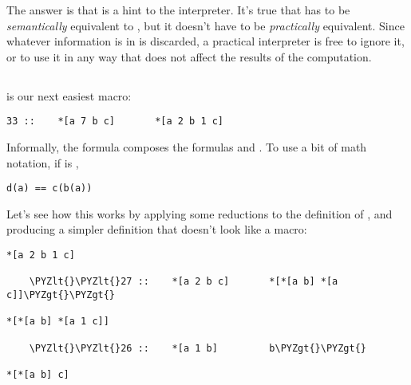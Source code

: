 The answer is that  is a hint to the interpreter.  It's true
that \kode{[10 b c]} has to be \emph{semantically} equivalent to , but
it doesn't have to be \emph{practically} equivalent.  Since whatever
information is in  is discarded, a practical interpreter is
free to ignore it, or to use it in any way that does not affect
the results of the computation.

\subsection{}

 is our next easiest macro:

\begin{framed_shaded}
\begin{Verbatim}[fontsize=\relsize{-2.5},fontseries=b,commandchars=\\\{\}]
33 ::    *[a 7 b c]       *[a 2 b 1 c]
\end{Verbatim}
\end{framed_shaded}

Informally, the formula \kode{[7 b c]} composes the formulas  and
.  To use a bit of math notation, if  is \kode{[7 b c]},

\begin{framed_shaded}
\begin{Verbatim}[fontsize=\relsize{-2.5},fontseries=b,commandchars=\\\{\}]
d(a) == c(b(a))
\end{Verbatim}
\end{framed_shaded}

Let's see how this works by applying some reductions to the
definition of , and producing a simpler definition that
doesn't look like a macro:

\begin{framed_shaded}
\begin{Verbatim}[fontsize=\relsize{-2.5},fontseries=b,commandchars=\\\{\}]
*[a 2 b 1 c]

    \PYZlt{}\PYZlt{}27 ::    *[a 2 b c]       *[*[a b] *[a c]]\PYZgt{}\PYZgt{}

*[*[a b] *[a 1 c]]

    \PYZlt{}\PYZlt{}26 ::    *[a 1 b]         b\PYZgt{}\PYZgt{}

*[*[a b] c]
\end{Verbatim}
\end{framed_shaded}

